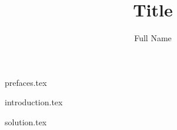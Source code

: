 \documentclass[
    a4paper,
    12pt
]{report}
\title{Title}
\author{Full Name}
\date{}
\begin{document}
\maketitle

{prefaces.tex}

{introduction.tex}

{solution.tex}
\end{document}
